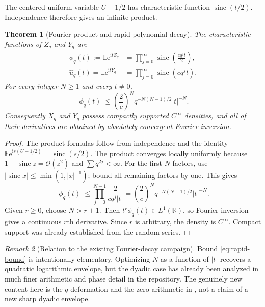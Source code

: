 \documentclass[11pt,oneside]{article}
\newtheorem{theorem}{Theorem}[section]
\theoremstyle{definition}
\theoremstyle{remark}
\newtheorem{remark}[theorem]{Remark}
\newcommand{\R}{\mathbb R}
\newcommand{\E}{\mathbb E}
\newcommand{\sinc}{\operatorname{sinc}}
\newcommand{\e}{\mathrm e}
\newcommand{\ii}{\mathrm i}
\newcommand{\bigO}{\mathcal O}
\begin{document}
The centered uniform variable $U-1/2$ has characteristic function
$\sinc(t/2)$.  Independence therefore gives an infinite product.

\begin{theorem}[Fourier product and rapid polynomial decay]
\label{thm:smoothness}
The characteristic functions of $Z_q$ and $Y_q$ are
\begin{align}
 \phi_q(t):=\E\e^{\ii tZ_q}
 &=\prod_{j=0}^{\infty}\sinc\!\left(\frac{cq^jt}{2}\right),  \label{eq:phi-z}\\
 \widehat u_q(t)=\E\e^{\ii tY_q}
 &=\prod_{j=0}^{\infty}\sinc(cq^jt).                         \label{eq:phi-y}
\end{align}
For every integer $N\ge1$ and every $t\ne0$,
\begin{equation}
 |\phi_q(t)|
 \le \left(\frac{2}{c}\right)^N q^{-N(N-1)/2}|t|^{-N}.      \label{eq:rapid-bound}
\end{equation}
Consequently $X_q$ and $Y_q$ possess compactly supported $C^\infty$ densities, and all
of their derivatives are obtained by absolutely convergent Fourier inversion.
\end{theorem}

\begin{proof}
The product formulas follow from independence and the identity
\(
 \E\e^{\ii s(U-1/2)}=\sinc(s/2).
\)
The product converges locally uniformly because
$1-\sinc z=\bigO(z^2)$ and $\sum q^{2j}<\infty$.
For the first $N$ factors, use $|\sinc x|\le\min(1,|x|^{-1})$; bound all remaining factors by
one.  This gives
\[
 |\phi_q(t)|
 \le\prod_{j=0}^{N-1}\frac{2}{cq^j|t|}
 =\left(\frac{2}{c}\right)^Nq^{-N(N-1)/2}|t|^{-N}.
\]
Given $r\ge0$, choose $N>r+1$.  Then $t^r\phi_q(t)\in L^1(\R)$, so Fourier inversion gives a
continuous $r$th derivative.  Since $r$ is arbitrary, the density is $C^\infty$.  Compact
support was already established from the random series.
\end{proof}

\begin{remark}[Relation to the existing Fourier-decay campaign]
Bound \eqref{eq:rapid-bound} is intentionally elementary.  Optimizing $N$ as a function of
$|t|$ recovers a quadratic logarithmic envelope, but the dyadic case has already been
analyzed in much finer arithmetic and phase detail in the repository.  The genuinely new
content here is the $q$-deformation and the zero arithmetic in , not a claim
of a new sharp dyadic envelope.
\end{remark}
\end{document}
